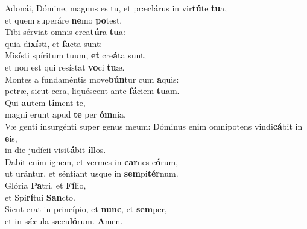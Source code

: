 \evenverse Adonái, Dómine, magnus es tu, et præclárus in vir\textbf{tú}te \textbf{tu}a,~\*\\
\evenverse et quem superáre \textbf{ne}mo \textbf{po}test.\\
\oddverse Tibi sérviat omnis crea\textbf{tú}ra \textbf{tu}a:~\*\\
\oddverse quia di\textbf{xí}sti, et \textbf{fa}cta sunt:\\
\evenverse Misísti spíritum tuum, \textbf{et} cre\textbf{á}ta sunt,~\*\\
\evenverse et non est qui resístat \textbf{vo}ci \textbf{tu}æ.\\
\oddverse Montes a fundaméntis move\textbf{bún}tur cum \textbf{a}quis:~\*\\
\oddverse petræ, sicut cera, liquéscent ante \textbf{fá}ciem \textbf{tu}am.\\
\evenverse Qui \textbf{au}tem \textbf{ti}ment te,~\*\\
\evenverse magni erunt apud \textbf{te} per \textbf{óm}nia.\\
\oddverse Væ genti insurgénti super genus meum: Dóminus enim omnípotens vindi\textbf{cá}bit in \textbf{e}is,~\*\\
\oddverse in die judícii visi\textbf{tá}bit \textbf{il}los.\\
\evenverse Dabit enim ignem, et vermes in \textbf{car}nes e\textbf{ó}rum,~\*\\
\evenverse ut urántur, et séntiant usque in \textbf{sem}pi\textbf{tér}num.\\
\oddverse Glória \textbf{Pa}tri, et \textbf{Fí}lio,~\*\\
\oddverse et Spi\textbf{rí}tui \textbf{San}cto.\\
\evenverse Sicut erat in princípio, et \textbf{nunc}, et \textbf{sem}per,~\*\\
\evenverse et in sǽcula sæcu\textbf{ló}rum. \textbf{A}men.\\

